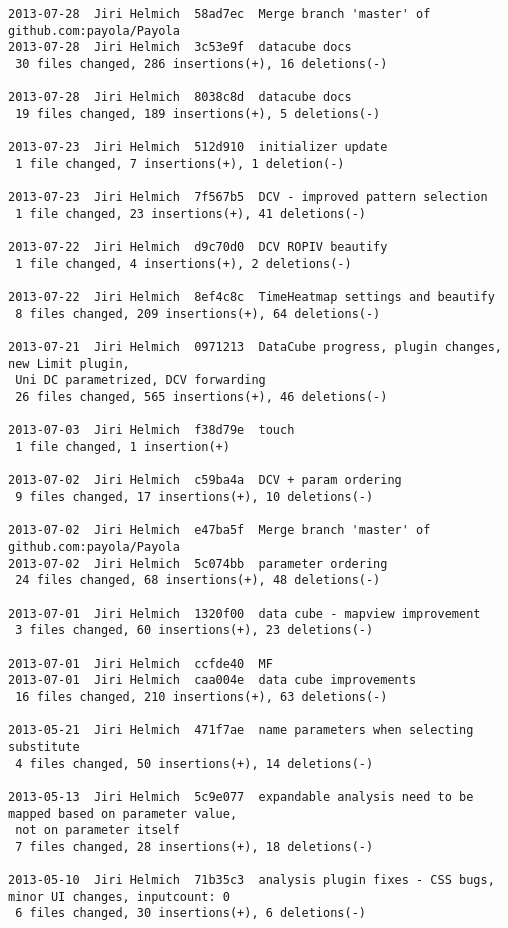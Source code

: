 {\begin{verbatim}
2013-07-28  Jiri Helmich  58ad7ec  Merge branch 'master' of github.com:payola/Payola
2013-07-28  Jiri Helmich  3c53e9f  datacube docs
 30 files changed, 286 insertions(+), 16 deletions(-)

2013-07-28  Jiri Helmich  8038c8d  datacube docs
 19 files changed, 189 insertions(+), 5 deletions(-)

2013-07-23  Jiri Helmich  512d910  initializer update
 1 file changed, 7 insertions(+), 1 deletion(-)

2013-07-23  Jiri Helmich  7f567b5  DCV - improved pattern selection
 1 file changed, 23 insertions(+), 41 deletions(-)

2013-07-22  Jiri Helmich  d9c70d0  DCV ROPIV beautify
 1 file changed, 4 insertions(+), 2 deletions(-)

2013-07-22  Jiri Helmich  8ef4c8c  TimeHeatmap settings and beautify
 8 files changed, 209 insertions(+), 64 deletions(-)

2013-07-21  Jiri Helmich  0971213  DataCube progress, plugin changes, new Limit plugin,
 Uni DC parametrized, DCV forwarding
 26 files changed, 565 insertions(+), 46 deletions(-)

2013-07-03  Jiri Helmich  f38d79e  touch
 1 file changed, 1 insertion(+)

2013-07-02  Jiri Helmich  c59ba4a  DCV + param ordering
 9 files changed, 17 insertions(+), 10 deletions(-)

2013-07-02  Jiri Helmich  e47ba5f  Merge branch 'master' of github.com:payola/Payola
2013-07-02  Jiri Helmich  5c074bb  parameter ordering
 24 files changed, 68 insertions(+), 48 deletions(-)

2013-07-01  Jiri Helmich  1320f00  data cube - mapview improvement
 3 files changed, 60 insertions(+), 23 deletions(-)

2013-07-01  Jiri Helmich  ccfde40  MF
2013-07-01  Jiri Helmich  caa004e  data cube improvements
 16 files changed, 210 insertions(+), 63 deletions(-)

2013-05-21  Jiri Helmich  471f7ae  name parameters when selecting substitute
 4 files changed, 50 insertions(+), 14 deletions(-)

2013-05-13  Jiri Helmich  5c9e077  expandable analysis need to be mapped based on parameter value,
 not on parameter itself
 7 files changed, 28 insertions(+), 18 deletions(-)

2013-05-10  Jiri Helmich  71b35c3  analysis plugin fixes - CSS bugs, minor UI changes, inputcount: 0
 6 files changed, 30 insertions(+), 6 deletions(-)


\end{verbatim}}

